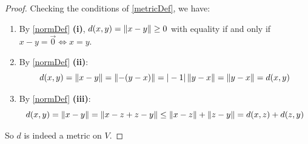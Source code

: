 \documentclass[../main.tex]{subfiles}
\begin{document}
\begin{proof}
  Checking the conditions of \cref{metricDef}, we have:
  \begin{enumerate}
    \item By \cref{normDef} \textbf{(i)}, $d(x, y) = \left\lVert x - y \right\rVert \geq 0$ with equality if and only if $x - y = \vec{0} \iff x = y$.
    \item By \cref{normDef} \textbf{(ii)}:
      \[
        d(x, y) = \left\lVert x - y \right\rVert = \left\lVert -(y - x) \right\rVert = |-1| \left\lVert y - x \right\rVert = \left\lVert y - x \right\rVert = d(x, y)
      \]
    \item By \cref{normDef} \textbf{(iii)}:
      \[
        d(x, y) = \left\lVert x - y \right\rVert = \left\lVert x - z + z - y \right\rVert \leq \left\lVert x - z \right\rVert + \left\lVert z - y \right\rVert = d(x, z) + d(z, y)
      \]
  \end{enumerate}
  So $d$ is indeed a metric on $V$.
\end{proof}
\end{document}
